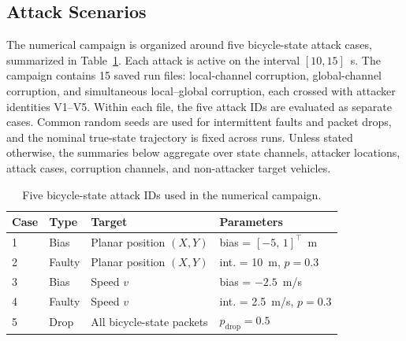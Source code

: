 \documentclass[letterpaper,journal]{IEEEtran}
\begin{document}
\subsection{Attack Scenarios}\label{sec:attack_scenarios}
The numerical campaign is organized around five bicycle-state attack cases, summarized in Table~\ref{tab:attack_mix}. Each attack is active on the interval $[10,15]$~s. The campaign contains 15 saved run files: local-channel corruption, global-channel corruption, and simultaneous local--global corruption, each crossed with attacker identities V1--V5. Within each file, the five attack IDs are evaluated as separate cases. Common random seeds are used for intermittent faults and packet drops, and the nominal true-state trajectory is fixed across runs. Unless stated otherwise, the summaries below aggregate over state channels, attacker locations, attack cases, corruption channels, and non-attacker target vehicles.

\begin{table}[!ht]
\centering
\caption{Five bicycle-state attack IDs used in the numerical campaign.}
\label{tab:attack_mix}
\scriptsize
\begin{tabular}{p{0.7cm}p{1.35cm}p{2.0cm}p{3.0cm}}
\toprule
\textbf{Case} & \textbf{Type} & \textbf{Target} & \textbf{Parameters} \\
\midrule
1 & Bias & Planar position $(X,Y)$ & bias = $[-5,\,1]^\top$~m \\
2 & Faulty & Planar position $(X,Y)$ & int. = 10~m, $p = 0.3$ \\
3 & Bias & Speed $v$ & bias = $-2.5$~m/s \\
4 & Faulty & Speed $v$ & int. = 2.5~m/s, $p = 0.3$ \\
5 & Drop & All bicycle-state packets & $p_\text{drop} = 0.5$ \\
\bottomrule
\end{tabular}
\end{table}

\end{document}
